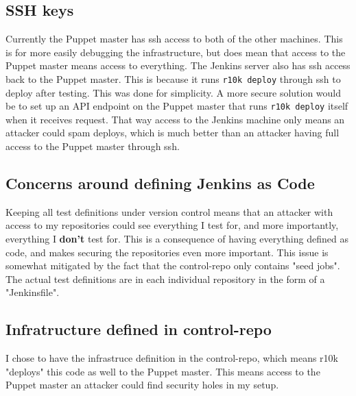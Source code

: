 \subsection{SSH keys}

Currently the Puppet master has ssh access to both of the other machines. This is for more easily debugging the infrastructure, but does mean that access to the Puppet master means access to everything. The Jenkins server also has ssh access back to the Puppet master. This is because it runs \texttt{r10k deploy} through ssh to deploy after testing. This was done for simplicity. A more secure solution would be to set up an API endpoint on the Puppet master that runs \texttt{r10k deploy} itself when it receives request. That way access to the Jenkins machine only means an attacker could spam deploys, which is much better than an attacker having full access to the Puppet master through ssh.

\subsection{Concerns around defining Jenkins as Code}

Keeping all test definitions under version control means that an attacker with access to my repositories could see everything I test for, and more importantly, everything I \textbf{don't} test for. This is a consequence of having everything defined as code, and makes securing the repositories even more important. This issue is somewhat mitigated by the fact that the control-repo only contains "seed jobs". The actual test definitions are in each individual repository in the form of a "Jenkinsfile".

\subsection{Infratructure defined in control-repo}

I chose to have the infrastruce definition in the control-repo, which means r10k "deploys" this code as well to the Puppet master. This means access to the Puppet master an attacker could find security holes in my setup. 




